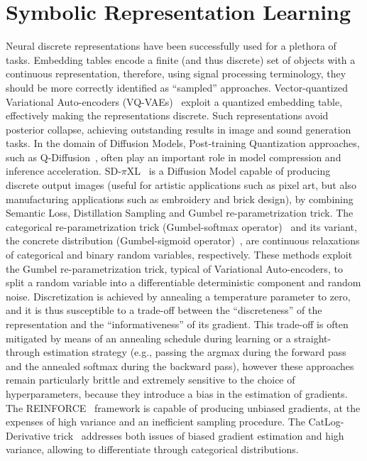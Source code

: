 \section{Symbolic Representation Learning}\label{nesy2023:sec:related}
Neural discrete representations have been successfully used for a plethora of tasks.
%
Embedding tables encode a finite (and thus discrete) set of objects with a continuous representation, therefore, using signal processing terminology, they should be more correctly identified as ``sampled'' approaches. 
Vector-quantized Variational Auto-encoders (VQ-VAEs)~\cite{van2017neural} exploit a quantized embedding table, effectively making the representations discrete. Such representations avoid posterior collapse, achieving outstanding results in image and sound generation tasks.
In the domain of Diffusion Models, Post-training Quantization approaches, such as Q-Diffusion~\cite{li2023q}, often play an important role in model compression and inference acceleration.
SD-$\pi$XL~\cite{binninger2024sd} is a Diffusion Model capable of producing discrete output images (useful for artistic applications such as pixel art, but also manufacturing applications such as embroidery and brick design), by combining Semantic Loss, Distillation Sampling and Gumbel re-parametrization trick.
The categorical re-parametrization trick (Gumbel-softmax operator)~\cite{jang2016categorical} and its variant, the concrete distribution (Gumbel-sigmoid operator)~\cite{maddison2016concrete}, are continuous relaxations of categorical and binary random variables, respectively. These methods exploit the Gumbel re-parametrization trick, typical of Variational Auto-encoders, to split a random variable into a differentiable deterministic component and random noise.
Discretization is achieved by annealing a temperature parameter to zero, and it is thus susceptible to a trade-off between the ``discreteness'' of the representation and the ``informativeness'' of its gradient. This trade-off is often mitigated by means of an annealing schedule during learning or a straight-through estimation strategy (e.g., passing the argmax during the forward pass and the annealed softmax during the backward pass), however these approaches remain particularly brittle and extremely sensitive to the choice of hyperparameters, because they introduce a bias in the estimation of gradients.
The REINFORCE~\cite{williams1992simple} framework is capable of producing unbiased gradients, at the expenses of high variance and an inefficient sampling procedure.
The CatLog-Derivative trick~\cite{de2023differentiable} addresses both issues of biased gradient estimation and high variance, allowing to differentiate through categorical distributions.
